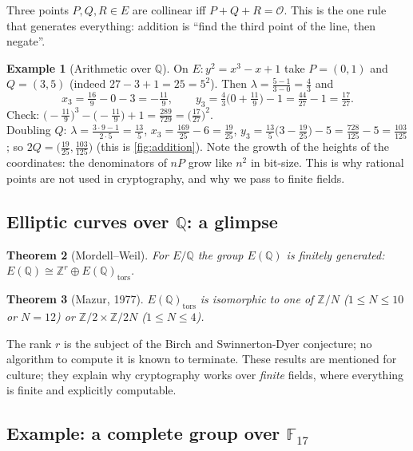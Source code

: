 \documentclass[11pt,a4paper,oneside]{book}
\theoremstyle{plain}
\newtheorem{theorem}{Theorem}[chapter]
\theoremstyle{definition}
\newtheorem{example}[theorem]{Example}
\theoremstyle{remark}
\newcommand{\Z}{\mathbb{Z}}
\newcommand{\Q}{\mathbb{Q}}
\newcommand{\F}{\mathbb{F}}
\newcommand{\Oinf}{\mathcal{O}}
\begin{document}
\begin{keyidea}
Three points $P,Q,R\in E$ are collinear iff $P+Q+R=\Oinf$. This is the one rule that generates everything: addition is ``find the third point of the line, then negate''.
\end{keyidea}

\begin{example}[Arithmetic over $\Q$]\label{ex:Q-arith}
On $E:y^2=x^3-x+1$ take $P=(0,1)$ and $Q=(3,5)$ (indeed $27-3+1=25=5^2$). Then $\lambda=\frac{5-1}{3-0}=\frac43$ and
\[x_3=\tfrac{16}{9}-0-3=-\tfrac{11}{9},\qquad y_3=\tfrac43\big(0+\tfrac{11}{9}\big)-1=\tfrac{44}{27}-1=\tfrac{17}{27}.\]
Check: $\big(\!-\tfrac{11}9\big)^3-\big(\!-\tfrac{11}9\big)+1=\tfrac{289}{729}=\big(\tfrac{17}{27}\big)^2$. \checkmark\\
Doubling $Q$: $\lambda=\frac{3\cdot9-1}{2\cdot5}=\frac{13}5$, $x_3=\frac{169}{25}-6=\frac{19}{25}$, $y_3=\frac{13}5\big(3-\frac{19}{25}\big)-5=\frac{728}{125}-5=\frac{103}{125}$; so $2Q=\big(\frac{19}{25},\frac{103}{125}\big)$ (this is \cref{fig:addition}).
Note the growth of the heights of the coordinates: the denominators of $nP$ grow like $n^2$ in bit-size. This is why rational points are not used in cryptography, and why we pass to finite fields.
\end{example}

\subsection{Elliptic curves over \texorpdfstring{$\Q$}{Q}: a glimpse}

\begin{theorem}[Mordell--Weil]
For $E/\Q$ the group $E(\Q)$ is finitely generated: $E(\Q)\cong\Z^r\oplus E(\Q)_{\mathrm{tors}}$.
\end{theorem}
\begin{theorem}[Mazur, 1977]
$E(\Q)_{\mathrm{tors}}$ is isomorphic to one of $\Z/N$ ($1\le N\le10$ or $N=12$) or $\Z/2\times\Z/2N$ ($1\le N\le4$).
\end{theorem}
The rank $r$ is the subject of the Birch and Swinnerton-Dyer conjecture; no algorithm to compute it is known to terminate. These results are mentioned for culture; they explain why cryptography works over \emph{finite} fields, where everything is finite and explicitly computable.

\subsection{Example: a complete group over \texorpdfstring{$\F_{17}$}{F17}}
\end{document}
